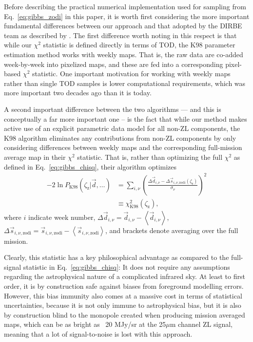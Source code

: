 \documentclass[twocolumn]{aa}
\newcommand{\dv}[0]{\vec{d}}
\newcommand{\s}[0]{\vec{s}}
\begin{document}
Before describing the practical numerical implementation used for
sampling from Eq.~\eqref{eq:gibbs_zodi} in this paper, it is worth
first considering the more important fundamental differences between
our approach and that adopted by the DIRBE team as described by
\citet{Kelsall1998}. The first difference worth noting in this respect
is that while our $\chi^2$ statistic is defined directly in terms of
TOD, the K98 parameter estimation method works with weekly maps. That
is, the raw data are co-added week-by-week into pixelized maps, and
these are fed into a corresponding pixel-based $\chi^2$ statistic. One
important motivation for working with weekly maps rather than single
TOD samples is lower computational requirements, which was more
important two decades ago than it is today.

A second important difference between the two algorithms --- and this
is conceptually a far more important one -- is the fact that while our
method makes active use of an explicit parametric data model for all
non-ZL components, the K98 algorithm eliminates any contributions from
non-ZL components by only considering differences between weekly maps
and the corresponding full-mission average map in their $\chi^2$
statistic. That is, rather than optimizing the full $\chi^2$ as
defined in Eq.~\eqref{eq:gibbs_chisq}, their algorithm optimizes
\begin{align}
  -2\ln P_{\mathrm{K98}}(\zeta_{\mathrm{z}}|\dv, \ldots) &= \sum_{i,\nu}
  \left(\frac{\Delta\dv_{i,\nu} -
    \Delta\s_{i,\nu,\mathrm{zodi}}(\zeta_\mathrm{s})}{\sigma_{\nu}}\right)^2 \\&\equiv
  \chi^2_{\mathrm{K98}} (\zeta_{\mathrm{z}}),
  \label{eq:k98_chisq}
\end{align}
where $i$ indicate week number, $\Delta \dv_{i,\nu} = \dv_{i,\nu} -
\left<\dv_{i,\nu}\right>$, $\Delta \s_{i,\nu,\mathrm{zodi}} =
\s_{i,\nu,\mathrm{zodi}} - \left<\s_{i,\nu,\mathrm{zodi}}\right>$, and brackets
denote averaging over the full mission.

Clearly, this statistic has a key philosophical advantage as compared
to the full-signal statistic in Eq.~\eqref{eq:gibbs_chisq}: It does
not require any assumptions regarding the astrophysical nature of a 
complicated infrared sky. At least to first order, it is by
construction safe against biases from foreground modelling
errors. However, this bias immunity also comes at a massive cost in
terms of statistical uncertainties, because it is not only immune to
astrophysical bias, but it is also by construction blind to the monopole 
created when producing mission averaged maps, which can be as bright as 
~20 MJy/sr at the 25$\mu$m channel ZL signal, meaning that a lot of 
signal-to-noise is lost with this approach.
\end{document}
